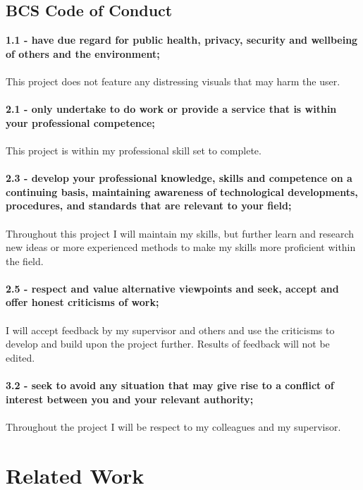 \documentclass[a4paper, 12pt]{article}
\begin{document}
        \subsection{BCS Code of Conduct}
            \textbf{1.1 - have due regard for public health, privacy, security and wellbeing of others 
            and the environment;} \\\\
            This project does not feature any distressing visuals that may harm the user. \\\\
            \textbf{2.1 - only undertake to do work or provide a service that is within your professional 
            competence;} \\\\
            This project is within my professional skill set to complete. \\\\
            \textbf{2.3 - develop your professional knowledge, skills and competence on a continuing 
            basis, maintaining awareness of technological developments, procedures, and standards 
            that are relevant to your field;} \\\\
            Throughout this project I will maintain my skills, but further learn and research new ideas 
            or more experienced methods to make my skills more proficient within the field. \\\\
            \textbf{2.5 - respect and value alternative viewpoints and seek, accept and offer honest 
            criticisms of work;} \\\\
            I will accept feedback by my supervisor and others and use the criticisms to develop and 
            build upon the project further. Results of feedback will not be edited. \\\\
            \textbf{3.2 - seek to avoid any situation that may give rise to a conflict of interest 
            between you and your relevant authority;} \\\\
            Throughout the project I will be respect to my colleagues and my supervisor.

    \clearpage
    \section{Related Work}
\end{document}
